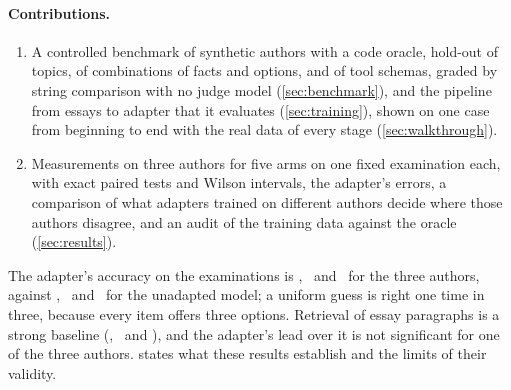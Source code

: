 \paragraph{Contributions.}
\begin{enumerate}
\item A controlled benchmark of synthetic authors with a code oracle, hold-out of topics, of
  combinations of facts and options, and of tool schemas, graded by string comparison with no
  judge model (\cref{sec:benchmark}), and the pipeline from essays to adapter that it
  evaluates (\cref{sec:training}), shown on one case from beginning to end with the real data
  of every stage (\cref{sec:walkthrough}).
\item Measurements on three authors for five arms on one fixed examination each, with exact
  paired tests and Wilson intervals, the adapter's errors, a comparison of what adapters
  trained on different authors decide where those authors disagree, and an audit of the
  training data against the oracle (\cref{sec:results}).
\end{enumerate}

The adapter's accuracy on the examinations is \AccATuned, \AccBTuned\ and \AccCTuned\ for the
three authors, against \AccABase, \AccBBase\ and \AccCBase\ for the unadapted model; a uniform
guess is right one time in three, because every item offers three options. Retrieval of essay
paragraphs is a strong baseline (\AccARetrieval, \AccBRetrieval\ and \AccCRetrieval), and the
adapter's lead over it is not significant for one of the three authors. 
states what these results establish and the limits of their validity.
